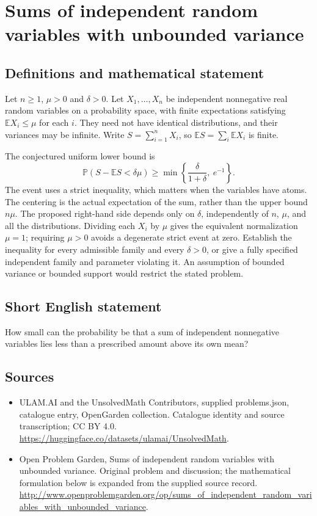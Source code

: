 \documentclass[11pt,a4paper]{article}
\begin{document}
\section*{Sums of independent random variables with unbounded variance}\label{statement}

\subsection{Definitions and mathematical statement}
Let $n\ge1$, $\mu>0$ and $\delta>0$. Let $X_1,\ldots,X_n$ be
independent nonnegative real random variables on a probability space,
with finite expectations satisfying $\mathbb E X_i\le\mu$ for each
$i$. They need not have identical distributions, and their variances
may be infinite. Write $S=\sum_{i=1}^n X_i$, so
$\mathbb E S=\sum_i\mathbb E X_i$ is finite.

The conjectured uniform lower bound is
\[
 \mathbb P(S-\mathbb E S<\delta\mu)
            \ge \min\left\{\frac{\delta}{1+\delta},\ e^{-1}\right\}.
\]
The event uses a strict inequality, which matters when the variables
have atoms. The centering is the actual expectation of the sum,
rather than the upper bound $n\mu$. The proposed right-hand side
depends only on $\delta$, independently of $n$, $\mu$, and all
the distributions. Dividing each $X_i$ by $\mu$ gives the equivalent
normalization $\mu=1$; requiring $\mu>0$ avoids a degenerate strict
event at zero.
Establish the inequality for every admissible family and every
$\delta>0$, or give a fully specified independent family and
parameter violating it. An assumption of bounded variance or
bounded support would restrict the stated problem.
\subsection{Short English statement}
How small can the probability be that a sum of independent nonnegative variables lies less than a prescribed amount above its own mean?
\subsection{Sources}
\begin{itemize}
\item[S1] ULAM.AI and the UnsolvedMath Contributors, supplied problems.json, catalogue entry, OpenGarden collection. Catalogue identity and source transcription; CC BY 4.0.
\url{https://huggingface.co/datasets/ulamai/UnsolvedMath}.
\item[S2] Open Problem Garden, Sums of independent random variables with unbounded variance. Original problem and discussion; the mathematical formulation below is expanded from the supplied source record.
\url{http://www.openproblemgarden.org/op/sums_of_independent_random_variables_with_unbounded_variance}.
\end{itemize}
\end{document}
